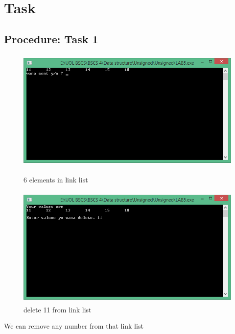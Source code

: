 \documentclass[11pt]{article}            %
\begin{document}
\section{Task}  
\subsection{Procedure: Task 1 }     

\begin{figure}
\centering
  \includegraphics[width=12cm,height=6cm,keepaspectratio]{1.png}
\caption{6 elements in link list}
\label{Figure:1}    
  \includegraphics[width=12cm,height=6cm,keepaspectratio]{2.png}
\caption{delete 11 from link list}
\label{Figure:2}   
\end{figure}
We can remove any number from that link list
\end{document}
